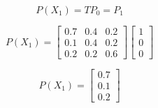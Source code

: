 \documentclass[11pt]{beamer}
\begin{document}
\begin{frame}
\begin{columns}
\begin{column}{0.5\textwidth}
			
			\[P(X_1) = TP_0=P_1\]
			
			\[P(X_1) = \begin{bmatrix}
			0.7 & 0.4 & 0.2\\
			0.1 & 0.4 & 0.2\\
			0.2 & 0.2 & 0.6
			\end{bmatrix} \begin{bmatrix}
						1 \\
						0 \\
						0
					  \end{bmatrix}\]
					  
			\[P(X_1) = 					  
			\begin{bmatrix}
						0.7 \\
						0.1 \\
						0.2
					  \end{bmatrix}		 \]
		\end{column}

	\end{columns}
	
\end{frame}
\end{document}
